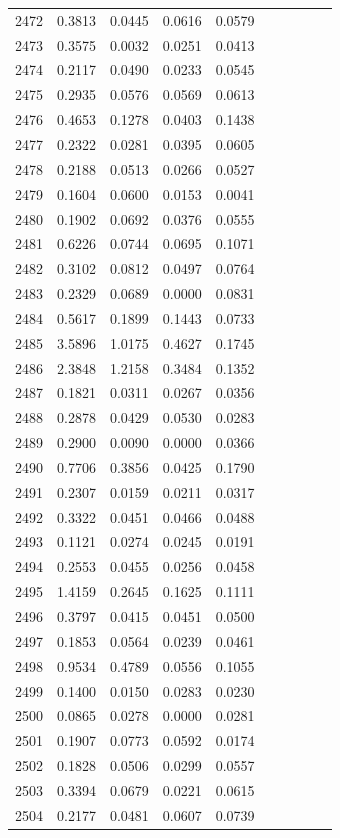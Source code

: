 \begin{table}
\begin{tabular}{cccccccccc}
2472& 0.3813& 0.0445& 0.0616& 0.0579\\ 
2473& 0.3575& 0.0032& 0.0251& 0.0413\\ 
2474& 0.2117& 0.0490& 0.0233& 0.0545\\ 
2475& 0.2935& 0.0576& 0.0569& 0.0613\\ 
2476& 0.4653& 0.1278& 0.0403& 0.1438\\ 
2477& 0.2322& 0.0281& 0.0395& 0.0605\\ 
2478& 0.2188& 0.0513& 0.0266& 0.0527\\ 
2479& 0.1604& 0.0600& 0.0153& 0.0041\\ 
2480& 0.1902& 0.0692& 0.0376& 0.0555\\ 
2481& 0.6226& 0.0744& 0.0695& 0.1071\\ 
2482& 0.3102& 0.0812& 0.0497& 0.0764\\ 
2483& 0.2329& 0.0689& 0.0000& 0.0831\\ 
2484& 0.5617& 0.1899& 0.1443& 0.0733\\ 
2485& 3.5896& 1.0175& 0.4627& 0.1745\\ 
2486& 2.3848& 1.2158& 0.3484& 0.1352\\ 
2487& 0.1821& 0.0311& 0.0267& 0.0356\\ 
2488& 0.2878& 0.0429& 0.0530& 0.0283\\ 
2489& 0.2900& 0.0090& 0.0000& 0.0366\\ 
2490& 0.7706& 0.3856& 0.0425& 0.1790\\ 
2491& 0.2307& 0.0159& 0.0211& 0.0317\\ 
2492& 0.3322& 0.0451& 0.0466& 0.0488\\ 
2493& 0.1121& 0.0274& 0.0245& 0.0191\\ 
2494& 0.2553& 0.0455& 0.0256& 0.0458\\ 
2495& 1.4159& 0.2645& 0.1625& 0.1111\\ 
2496& 0.3797& 0.0415& 0.0451& 0.0500\\ 
2497& 0.1853& 0.0564& 0.0239& 0.0461\\ 
2498& 0.9534& 0.4789& 0.0556& 0.1055\\ 
2499& 0.1400& 0.0150& 0.0283& 0.0230\\ 
2500& 0.0865& 0.0278& 0.0000& 0.0281\\ 
2501& 0.1907& 0.0773& 0.0592& 0.0174\\ 
2502& 0.1828& 0.0506& 0.0299& 0.0557\\ 
2503& 0.3394& 0.0679& 0.0221& 0.0615\\ 
2504& 0.2177& 0.0481& 0.0607& 0.0739\\ 

\end{tabular}
\end{table}
